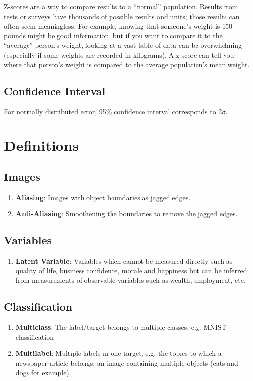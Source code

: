 \documentclass[a4paper, 12pt]{report}
\begin{document}
Z-scores are a way to compare results to a “normal” population. Results from tests or surveys have thousands of possible results and units; those results can often seem meaningless. For example, knowing that someone’s weight is 150 pounds might be good information, but if you want to compare it to the “average” person’s weight, looking at a vast table of data can be overwhelming (especially if some weights are recorded in kilograms). A z-score can tell you where that person’s weight is compared to the average population’s mean weight.

\section{Confidence Interval}
For normally distributed error, 95\% confidence interval corresponds to 2$\sigma$.

\chapter{Definitions}

\section{Images}
\begin{enumerate}

\item \textbf{Aliasing}: Images with object boundaries as jagged edges. 
\item \textbf{Anti-Aliasing}: Smoothening the boundaries to remove the jagged edges.

\end{enumerate}

\section{Variables}
\begin{enumerate}
\item \textbf{Latent Variable}: Variables which cannot be measured directly such as quality of life, business confidence, morale and happiness but can be inferred from measurements of observable variables such as wealth, employment, etc.

\end{enumerate}

\section{Classification}
\begin{enumerate}
\item \textbf{Multiclass}: The label/target belongs to multiple classes, e.g. MNIST classification
\item \textbf{Multilabel}: Multiple labels in one target, e.g. the topics to which a newspaper article belongs, an image containing multiple objects (cats and dogs for example).
\end{enumerate}
\end{document}
